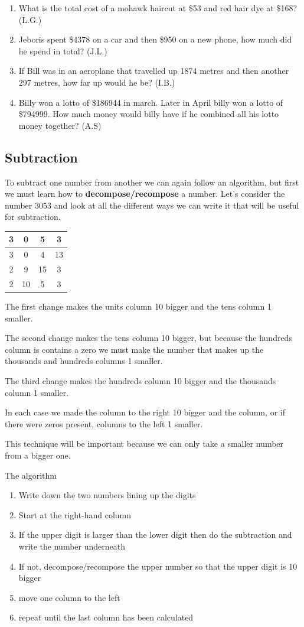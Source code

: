 \begin{multicols}{2}
\begin{enumerate}
  \item What is the total cost of a mohawk haircut at \$53 and red hair dye at \$168? (L.G.)
  \item Jeboris spent \$4378 on a car and then \$950 on a new phone, how much did he spend in total? (J.L.)
  \item If Bill was in an aeroplane that travelled up 1874 metres and then another 297 metres, how far up would he be? (I.B.)
  \item Billy won a lotto of \$186944 in march. Later in April billy won a lotto of \$794999.  How much money would billy have if he combined all his lotto money together? (A.S)
\end{enumerate}
\end{multicols}
\subsection{Subtraction}
To subtract one number from another we can again follow an algorithm, but first we must learn how to \textbf{decompose/recompose} a number.
\noindent Let's consider the number $3053$ and look at all the different ways we can write it that will be useful for subtraction.

\renewcommand{\arraystretch}{1}
\begin{tabular}{| c | c | c | c |}
	\hline
	3 & 0 & 5 & 3 \\
	\hline
	3 & 0 & 4 & 13 \\
	\hline
	2 & 9 & 15 & 3 \\
	\hline
	2 & 10 & 5 & 3\\
	\hline
\end{tabular}

The first change makes the units column 10 bigger and the tens column 1 smaller.

The second change makes the tens column 10 bigger, but because the hundreds column is contains a zero we must make the number that makes up the thousands and hundreds columns 1 smaller.

The third change makes the hundreds column 10 bigger and the thousands column 1 smaller.

In each case we made the column to the right 10 bigger and the column, or if there were zeros present, columns to the left 1 smaller.

This technique will be important because we can only take a smaller number from a bigger one.

The algorithm
\begin{enumerate}
  \item Write down the two numbers lining up the digits
  \item Start at the right-hand column
  \item If the upper digit is larger than the lower digit then do the subtraction and write the number underneath
  \item If not, decompose/recompose the upper number so that the upper digit is 10 bigger
  \item move one column to the left
  \item repeat until the last column has been calculated
\end{enumerate}


